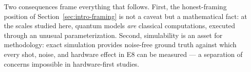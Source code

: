 Two consequences frame everything that follows. First, the honest-framing
position of Section~\ref{sec:intro-framing} is not a caveat but a mathematical
fact: at the scales studied here, quantum models \emph{are} classical
computations, executed through an unusual parameterization. Second,
simulability is an asset for methodology: exact simulation provides
noise-free ground truth against which every shot, noise, and hardware effect
in E8 can be measured --- a separation of concerns impossible in
hardware-first studies.
